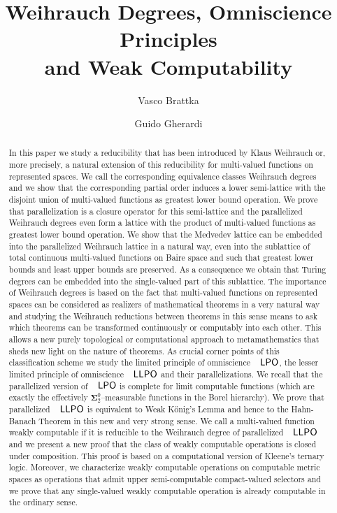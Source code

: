 \documentclass[jsl,10pt]{noasl}
\title[Weihrauch Degrees and Omniscience Principles]
      {Weihrauch Degrees, Omniscience Principles\\ and Weak Computability}
\author{Vasco Brattka}
\author{Guido Gherardi}
\newcommand{\SO}[1]{{{\boldsymbol\Sigma}^0_{#1}}}
\def\LPO{\text{\rm\sffamily LPO}}
\def\LLPO{\text{\rm\sffamily LLPO}}
\def\LPO{\text{\rm\sffamily LPO}}
\def\LLPO{\text{\rm\sffamily LLPO}}
\begin{document}
\begin{abstract} 
In this paper we study a reducibility that has been introduced by Klaus Weihrauch or, 
more precisely, a natural extension of this reducibility for multi-valued functions 
on represented spaces.
We call the corresponding equivalence classes Weihrauch degrees and we show that 
the corresponding partial order induces a lower semi-lattice with the disjoint union of multi-valued 
functions as greatest lower bound operation.
We prove that parallelization is a closure operator for this semi-lattice
and the parallelized Weihrauch degrees even form a lattice with the
product of multi-valued functions as greatest lower bound operation.
We show that the Medvedev lattice can be embedded into the parallelized
Weihrauch lattice in a natural way, even into the sublattice of total continuous multi-valued
functions on Baire space and such that greatest lower bounds and least upper
bounds are preserved.
As a consequence we obtain that Turing degrees can be embedded
into the single-valued part of this sublattice.
The importance of Weihrauch degrees is based on the fact that multi-valued functions on 
represented spaces can be considered as realizers of 
mathematical theorems in a very natural way and studying the Weihrauch reductions between 
theorems in this sense means to ask which theorems can be 
transformed continuously or computably into each other. 
This allows a new purely topological or computational approach to 
metamathematics that sheds new light on the nature of theorems.
As crucial corner points of this classification scheme we study the 
limited principle of omniscience $\LPO$,
the lesser limited principle of omniscience $\LLPO$ and their parallelizations.
We recall that the parallelized version of $\LPO$ is complete for limit
computable functions (which are exactly the effectively $\SO{2}$--measurable
functions in the Borel hierarchy).
We prove that parallelized $\LLPO$
is equivalent to Weak K\H{o}nig's Lemma and hence to the Hahn-Banach Theorem
in this new and very strong sense.
We call a multi-valued function weakly computable
if it is reducible to the Weihrauch degree of parallelized $\LLPO$ and we
present a new proof that the class of weakly computable operations
is closed under composition. This proof is based on a computational
version of Kleene's ternary logic. Moreover, we characterize weakly
computable operations on computable metric spaces as operations that
admit upper semi-computable compact-valued selectors and we prove
that any single-valued weakly computable operation is already computable
in the ordinary sense.
\end{abstract}
\end{document}
